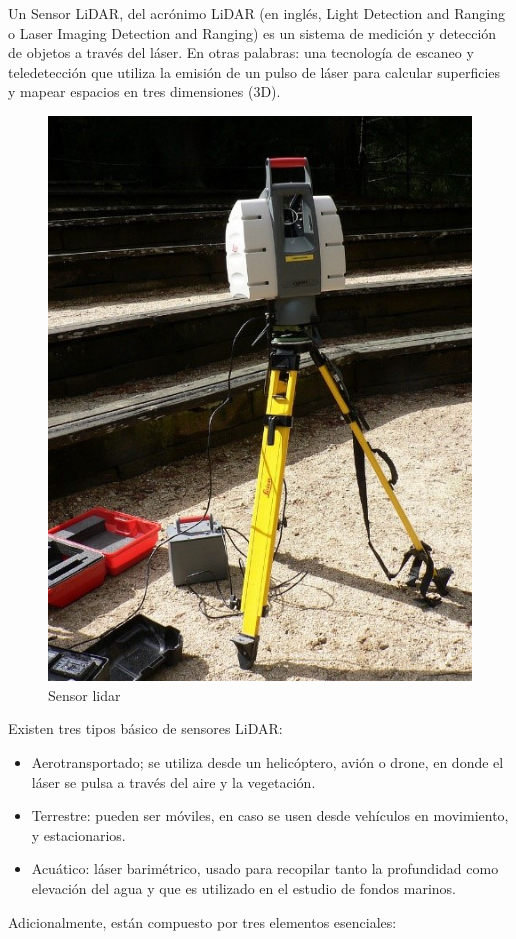 Un Sensor LiDAR, del acrónimo LiDAR (en inglés, Light Detection and Ranging o Laser Imaging Detection and Ranging) es un sistema de medición y detección de objetos a través del láser. En otras palabras: una tecnología de escaneo y teledetección que utiliza la emisión de un pulso de láser para calcular superficies y mapear espacios en tres dimensiones (3D).


\begin{figure}[h]
	\centering
	\includegraphics[width=0.7\linewidth]{img/LIDAR.jpg}
	\caption{Sensor lidar}
	\label{fig:insertarimagen}
\end{figure}

Existen tres tipos básico de sensores LiDAR:

\begin{itemize}
    \item Aerotransportado; se utiliza desde un helicóptero, avión o drone, en donde el láser se pulsa a través del aire y la vegetación.
     \item Terrestre: pueden ser móviles, en caso se usen desde vehículos en movimiento, y estacionarios.
    \item Acuático: láser barimétrico, usado para recopilar tanto la profundidad como elevación del agua y que es utilizado en el estudio de fondos marinos.
\end{itemize}

Adicionalmente, están compuesto por tres elementos esenciales:

